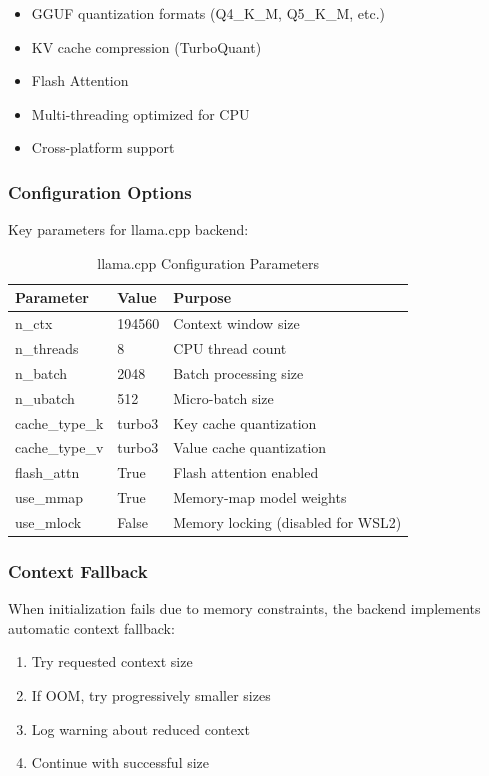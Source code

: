 \begin{itemize}
    \item GGUF quantization formats (Q4\_K\_M, Q5\_K\_M, etc.)
    \item KV cache compression (TurboQuant)
    \item Flash Attention
    \item Multi-threading optimized for CPU
    \item Cross-platform support
\end{itemize}

\subsubsection{Configuration Options}

Key parameters for llama.cpp backend:

\begin{table}[h]
\centering
\caption{llama.cpp Configuration Parameters}
\label{tab:llama_config}
\begin{tabular}{lll}
\toprule
\textbf{Parameter} & \textbf{Value} & \textbf{Purpose} \\
\midrule
n\_ctx & 194560 & Context window size \\
n\_threads & 8 & CPU thread count \\
n\_batch & 2048 & Batch processing size \\
n\_ubatch & 512 & Micro-batch size \\
cache\_type\_k & turbo3 & Key cache quantization \\
cache\_type\_v & turbo3 & Value cache quantization \\
flash\_attn & True & Flash attention enabled \\
use\_mmap & True & Memory-map model weights \\
use\_mlock & False & Memory locking (disabled for WSL2) \\
\bottomrule
\end{tabular}
\end{table}

\subsubsection{Context Fallback}

When initialization fails due to memory constraints, the backend implements automatic context fallback:

\begin{enumerate}
    \item Try requested context size
    \item If OOM, try progressively smaller sizes
    \item Log warning about reduced context
    \item Continue with successful size
\end{enumerate}

